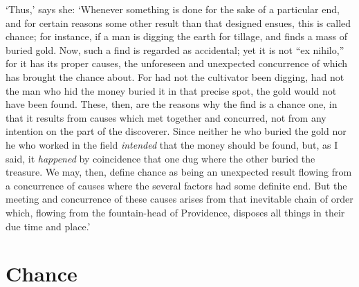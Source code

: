 \documentclass[12pt]{book}
\begin{document}
`Thus,' says she: `Whenever something is done for the sake of a
particular end, and for certain reasons some other result than that
designed ensues, this is called chance; for instance, if a man is
digging the earth for tillage, and finds a mass of buried gold. Now,
such a find is regarded as accidental; yet it is not ``ex nihilo,'' for it
has its proper causes, the unforeseen and unexpected concurrence of
which has brought the chance about. For had not the cultivator been
digging, had not the man who hid the money buried it in that precise
spot, the gold would not have been found. These, then, are the reasons
why the find is a chance one, in that it results from causes which met
together and concurred, not from any intention on the part of the
discoverer. Since neither he who buried the gold nor he who worked in
the field \emph{intended} that the money should be found, but, as I said, it
\emph{happened} by coincidence that one dug where the other buried the
treasure. We may, then, define chance as being an unexpected result
flowing from a concurrence of causes where the several factors had some
definite end. But the meeting and concurrence of these causes arises
from that inevitable chain of order which, flowing from the
fountain-head of Providence, disposes all things in their due time and
place.'



\section{Chance}
\end{document}
